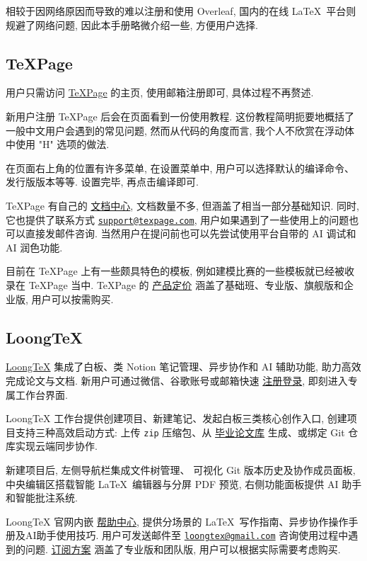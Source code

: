 相较于因网络原因而导致的难以注册和使用 Overleaf,
国内的在线 \LaTeX\ 平台则规避了网络问题,
因此本手册略微介绍一些,
方便用户选择.

\subsection{TeXPage}

用户只需访问 \href{https://www.texpage.com/}{TeXPage} 的主页,
使用邮箱注册即可,
具体过程不再赘述.

新用户注册 TeXPage 后会在页面看到一份使用教程.
这份教程简明扼要地概括了一般中文用户会遇到的常见问题,
然而从代码的角度而言,
我个人不欣赏在浮动体中使用 "H" 选项的做法.

在页面右上角的位置有许多菜单,
在\textsf{设置}菜单中,
用户可以选择默认的编译命令、发行版版本等等.
设置完毕,
再点击编译即可.

TeXPage 有自己的%
\href{https://www.texpage.com/docs}{文档中心},
文档数量不多,
但涵盖了相当一部分基础知识.
同时,
它也提供了联系方式 \href{mailto:support@texpage.com}%
{\texttt{support@texpage.com}},
用户如果遇到了一些使用上的问题也可以直接发邮件咨询.
当然用户在提问前也可以先尝试使用平台自带的 AI 调试和 AI 润色功能.

目前在 TeXPage 上有一些颇具特色的模板,
例如建模比赛的一些模板就已经被收录在 TeXPage 当中.
TeXPage 的%
\href{https://www.texpage.com/zh/pricing}{产品定价}%
涵盖了基础班、专业版、旗舰版和企业版,
用户可以按需购买.

\subsection{LoongTeX}

\href{https://www.loongtex.com/}{LoongTeX}
集成了白板、类 Notion 笔记管理、异步协作和 AI 辅助功能, 助力高效完成论文与文档.
新用户可通过微信、谷歌账号或邮箱快速%
\href{https://app.loongtex.com/user/login}{注册登录},
即刻进入专属工作台界面.

LoongTeX 工作台提供创建项目、新建笔记、发起白板三类核心创作入口,
创建项目支持三种高效启动方式: 上传 \texttt{zip} 压缩包、从%
\href{https://www.loongtex.com/templates/}{毕业论文库}%
生成、或绑定 Git 仓库实现云端同步协作.

新建项目后, 左侧导航栏集成文件树管理、
可视化 Git 版本历史及协作成员面板,
中央编辑区搭载智能 \LaTeX\ 编辑器与分屏 PDF 预览,
右侧功能面板提供 AI 助手和智能批注系统.

LoongTeX 官网内嵌%
\href{https://www.loongtex.com/docs/app/help/}{帮助中心},
提供分场景的 \LaTeX\ 写作指南、异步协作操作手册及AI助手使用技巧.
用户可发送邮件至
\href{mailto:loongtex@gmail.com}{\texttt{loongtex@gmail.com}}
咨询使用过程中遇到的问题.
\href{https://www.loongtex.com/pricing}{订阅方案}%
涵盖了专业版和团队版,
用户可以根据实际需要考虑购买.

